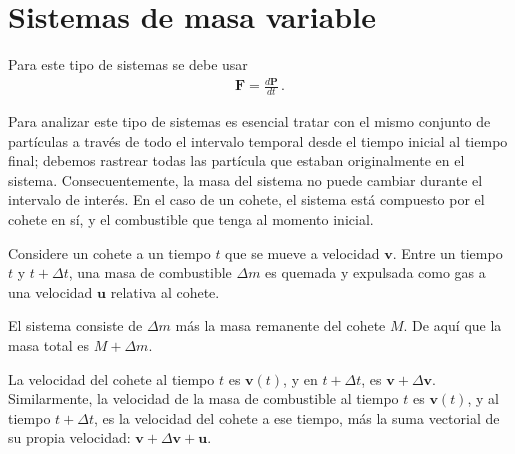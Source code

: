 \section{Sistemas de masa variable}
Para este tipo de sistemas se debe usar
\begin{align}
  \mathbf{F}=\frac{d\mathbf{P}}{dt}\,.
\end{align}

Para analizar este tipo de sistemas es esencial tratar con el mismo conjunto de partículas a través de todo el intervalo temporal desde el tiempo inicial al tiempo final; debemos rastrear todas las partícula que estaban originalmente en el sistema. Consecuentemente, la masa del sistema no puede cambiar durante el intervalo de interés. En el caso de un cohete, el sistema está compuesto por el cohete en sí, y el combustible que tenga al momento inicial. 



Considere un cohete a un tiempo $t$ que se mueve a velocidad $\mathbf{v}$. Entre un tiempo $t$ y $t+\Delta t$, una masa de combustible $\Delta m$ es quemada y expulsada como gas a una velocidad $\mathbf{u}$ relativa al cohete.

El sistema consiste de $\Delta m$ más la masa remanente del cohete $M$. De aquí que la masa total es $M+\Delta m$.

La velocidad del cohete al tiempo $t$ es $\mathbf{v}(t)$, y en $t+\Delta t$, es $\mathbf{v}+\Delta\mathbf{v}$. Similarmente, la velocidad de la masa de combustible al tiempo $t$ es $\mathbf{v}(t)$, y al tiempo $t+\Delta t$, es la velocidad del cohete a ese tiempo, más la suma vectorial de su propia velocidad: $\mathbf{v}+\Delta\mathbf{v}+\mathbf{u}$. 

